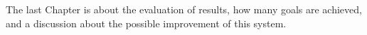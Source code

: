 \documentclass[
	english,
	ruledheaders=section,%
	class=report,%
	thesis={type=Report},%
	accentcolor=9c,%
	custommargins=true,%
	marginpar=false,%
	parskip=half-,%
	fontsize=11pt,%
	logofile={img/tuda_logo.pdf}, %
]{tudapub}
\begin{document}


The last Chapter is about the evaluation of results, how many goals are achieved, and a discussion about the possible improvement of this system.





\end{document}
